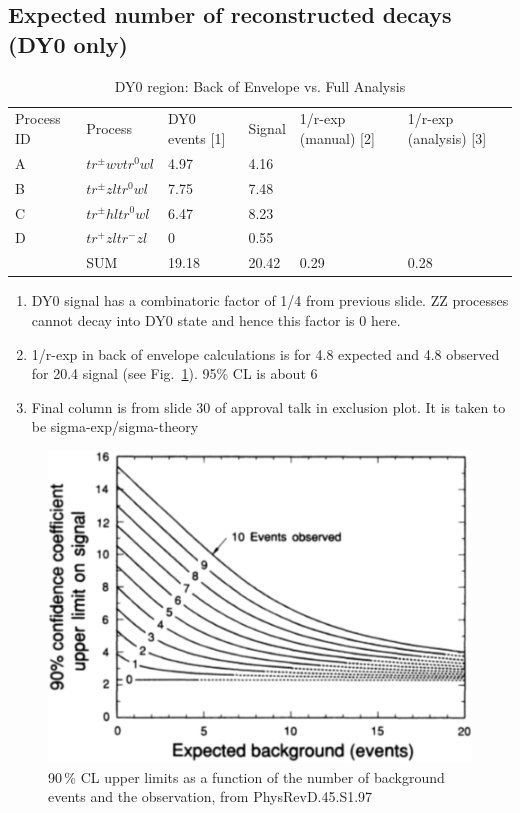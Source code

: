 \subsection*{Expected number of reconstructed decays (DY0 only)}

\begin{table}[h!]
\centering
\caption{DY0 region: Back of Envelope vs. Full Analysis} %
\begin{tabular}{llllll}
Process ID & Process       & DY0 events [1] & Signal & 1/r-exp (manual) [2] & 1/r-exp (analysis) [3] \\
A          & $tr^\pm wvtr^0wl$ & 4.97                                & 4.16                     &                                   &                               \\
B          & $tr^\pm zltr^0wl$ & 7.75                                & 7.48                     &                                   &                               \\
C          & $tr^\pm hltr^0wl$ & 6.47                                & 8.23                     &                                   &                               \\
D          & $tr^+zltr^-zl$    & 0                                   & 0.55                     &                                   &                               \\
           & SUM           & 19.18                               & 20.42                    & 0.29                              & 0.28                         
\end{tabular}
\end{table}

\begin{enumerate}
	\item DY0 signal has a combinatoric factor of 1/4 from previous slide. ZZ processes cannot decay into DY0 state and hence this factor is 0 here.
	\item 1/r-exp in back of envelope calculations is for 4.8 expected and 4.8 observed for 20.4 signal (see Fig.~\ref{fig:limitEstimate}). 95\% CL is about 6
	\item Final column is from slide 30 of approval talk in exclusion plot. It is taken to be sigma-exp/sigma-theory
\end{enumerate}

\begin{figure}[h!]
\begin{center}
	\includegraphics[width=.5\textwidth]{Appendix/limitEstimate}
	\caption{90\,\% CL upper limits as a function of the number of background events and the observation, from PhysRevD.45.S1.97
	\label{fig:limitEstimate}}
\end{center}
\end{figure}
